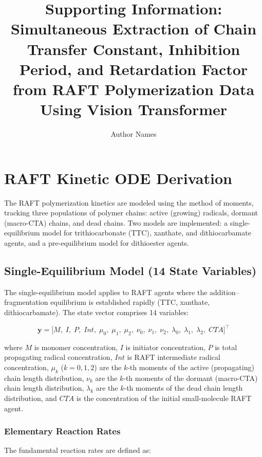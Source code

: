 \documentclass[journal=mamobx,manuscript=suppinfo]{achemso}
\author{Author Names}
\affiliation{Affiliation}
\title{Supporting Information:\\
Simultaneous Extraction of Chain Transfer Constant, Inhibition Period,
and Retardation Factor from RAFT Polymerization Data Using Vision Transformer}
\begin{document}
\section{RAFT Kinetic ODE Derivation}
\label{sec:ode-derivation}

The RAFT polymerization kinetics are modeled using the method of moments,
tracking three populations of polymer chains: active (growing) radicals,
dormant (macro-CTA) chains, and dead chains. Two models are implemented:
a single-equilibrium model for trithiocarbonate (TTC), xanthate, and
dithiocarbamate agents, and a pre-equilibrium model for dithioester agents.

\subsection{Single-Equilibrium Model (14 State Variables)}
\label{sec:single-eq}

The single-equilibrium model applies to RAFT agents where the addition--fragmentation
equilibrium is established rapidly (TTC, xanthate, dithiocarbamate). The state
vector comprises 14 variables:

\begin{equation}
\mathbf{y} = \bigl[
  M,\; I,\; P,\; \mathit{Int},\;
  \mu_0,\; \mu_1,\; \mu_2,\;
  \nu_0,\; \nu_1,\; \nu_2,\;
  \lambda_0,\; \lambda_1,\; \lambda_2,\;
  \mathit{CTA}
\bigr]^\top
\end{equation}

\noindent where $M$ is monomer concentration, $I$ is initiator concentration,
$P$ is total propagating radical concentration, $\mathit{Int}$ is RAFT
intermediate radical concentration, $\mu_k$ ($k = 0, 1, 2$) are the $k$-th
moments of the active (propagating) chain length distribution, $\nu_k$ are the
$k$-th moments of the dormant (macro-CTA) chain length distribution,
$\lambda_k$ are the $k$-th moments of the dead chain length distribution, and
$\mathit{CTA}$ is the concentration of the initial small-molecule RAFT agent.

\subsubsection{Elementary Reaction Rates}

The fundamental reaction rates are defined as:
\end{document}
